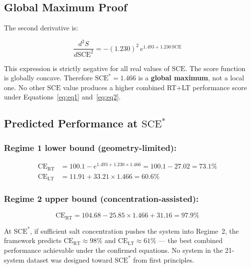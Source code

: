 \documentclass[12pt,letterpaper]{article}
\newcommand{\mSCE}{\mathrm{SCE}}
\newcommand{\mSCEstar}{\mathrm{SCE}^{*}}
\newcommand{\mCERT}{\mathrm{CE}_{\mathrm{RT}}}
\newcommand{\mCELT}{\mathrm{CE}_{\mathrm{LT}}}
\begin{document}
\subsection{Global Maximum Proof}
\label{sec:global}

The second derivative is:

\begin{equation}
  \frac{d^{2}S}{d\mSCE^{2}}
  = -(1.230)^{2}\,e^{1.493 + 1.230\,\mSCE}
  \label{eq:secondderiv}
\end{equation}

This expression is strictly negative for all real values
of $\mSCE$.
The score function is globally concave.
Therefore $\mSCEstar = 1.466$ is a \textbf{global maximum},
not a local one.
No other $\mSCE$ value produces a higher combined
RT$+$LT performance score under
Equations~\ref{eq:eq1} and~\ref{eq:eq2}.

\subsection{Predicted Performance at $\mSCEstar$}
\label{sec:prediction}

\subsubsection*{Regime 1 lower bound (geometry-limited):}

\begin{align}
  \mCERT &= 100.1 - e^{1.493 + 1.230 \times 1.466}
           = 100.1 - 27.02 = 73.1\%
  \label{eq:cert_r1}\\
  \mCELT &= 11.91 + 33.21 \times 1.466 = 60.6\%
  \label{eq:celt_r1}
\end{align}

\subsubsection*{Regime 2 upper bound
(concentration-assisted):}

\begin{equation}
  \mCERT = 104.68 - 25.85 \times 1.466 + 31.16
         = 97.9\%
  \label{eq:cert_r2}
\end{equation}

At $\mSCEstar$, if sufficient salt concentration pushes
the system into Regime~2, the framework predicts
$\mCERT \approx 98\%$ and
$\mCELT \approx 61\%$ ---
the best combined performance achievable under the
confirmed equations.
No system in the 21-system dataset was designed toward
$\mSCEstar$ from first principles.
\end{document}
